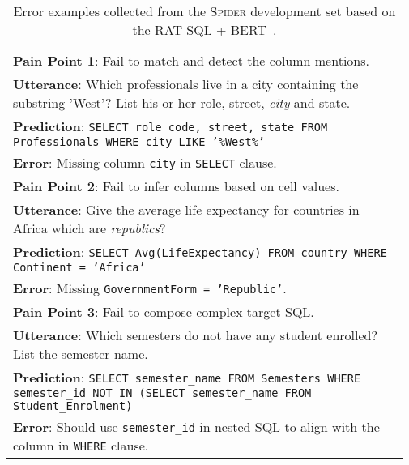 \documentclass[letterpaper]{article} \usepackage{aaai21}  \usepackage{times}  \usepackage{helvet} \usepackage{courier}  \usepackage[hyphens]{url}  \usepackage{graphicx} \usepackage{booktabs}
\begin{document}
\begin{table}[t]
  \centering \small
    \begin{tabularx}{\linewidth}{L{0.97 \linewidth}}
    \toprule
    \textbf{Pain Point 1}: Fail to match and detect the column mentions. \\
    \textbf{Utterance}: Which professionals live in a city containing the substring 'West'? List his or her role, street, \textit{city} and state. \\
    \textbf{Prediction}: \texttt{SELECT role\_code, street, state FROM Professionals WHERE city LIKE '\%West\%'} \\
    \textbf{Error}: Missing column \texttt{city} in \texttt{SELECT} clause. \\

    \midrule
    \textbf{Pain Point 2}: Fail to infer columns based on cell values. \\
    \textbf{Utterance}: Give the average life expectancy for countries in Africa which are \textit{republics}? \\
    \textbf{Prediction}: \texttt{SELECT Avg(LifeExpectancy) FROM country WHERE Continent = 'Africa'} \\
    \textbf{Error}: Missing \texttt{GovernmentForm = 'Republic'}. \\
    
    \midrule
    
    \textbf{Pain Point 3}: Fail to compose complex target SQL. \\
    \textbf{Utterance}: Which semesters do not have any student enrolled? List the semester name. \\
    \textbf{Prediction}: \texttt{SELECT semester\_name FROM Semesters WHERE semester\_id NOT IN (SELECT semester\_name FROM Student\_Enrolment)} \\
    \textbf{Error}: Should use \texttt{semester\_id} in nested SQL to align with the column in \texttt{WHERE} clause. \\


    \bottomrule
    \end{tabularx}\caption{Error examples collected from the \textsc{Spider} development set based on the RAT-SQL + BERT~\cite{wang2019rat}.}
  \label{tab:examples}\vspace{-3mm}
\end{table}
\end{document}
